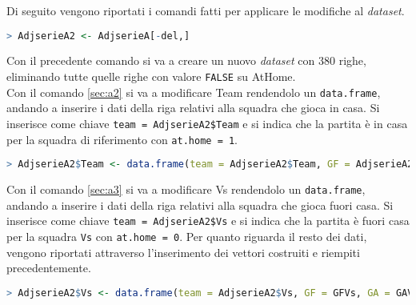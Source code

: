 Di seguito vengono riportati i comandi fatti per applicare le modifiche al \emph{dataset}.

\begin{lstlisting}[language=R]
	> AdjserieA2 <- AdjserieA[-del,]
\end{lstlisting}

Con il precedente comando si va a creare un nuovo \emph{dataset} con 380 righe, eliminando tutte quelle righe con valore \texttt{FALSE} su \textsf{AtHome}. \\
Con il comando \ref{sec:a2} si va a modificare \textsf{Team} rendendolo un \texttt{data.frame}, andando a inserire i dati della riga relativi alla squadra che gioca in casa. Si inserisce come chiave \texttt{team = AdjserieA2\$Team} e si indica che la partita è in casa per la squadra di riferimento con \texttt{at.home = 1}.\\

\begin{lstlisting}[language=R, caption={Codice per la creazione del data.frame Team}, label=sec:a2] 
	> AdjserieA2$Team <- data.frame(team = AdjserieA2$Team, GF = AdjserieA2$GF, GA = AdjserieA2$GA,  at.home = 1, Poss = AdjserieA2$Poss, Sh = AdjserieA2$Sh, SoT = AdjserieA2$SoT, G.Sh = AdjserieA2$G.Sh, PAtt = AdjserieA2$PAtt, PCmp. = AdjserieA2$PCmp., SPAtt = AdjserieA2$SPAtt, SPCmp. = AdjserieA2$SPCmp., MPAtt = AdjserieA2$MPAtt, MPCmp. = AdjserieA2$MPCmp., LPAtt = AdjserieA2$LPAtt, LPCmp. = AdjserieA2$LPCmp., ToDef3rd = AdjserieA2$ToDef3rd, ToAtt3rd = AdjserieA2$ToAtt3rd, ToAttPen = AdjserieA2$ToAttPen, TotDist = AdjserieA2$TotDist, Fls = AdjserieA2$Fls, Fld = AdjserieA2$Fld, Crs = AdjserieA2$Crs, Int = AdjserieA2$Int, TklWin = AdjserieA2$TklWin, Recov = AdjserieA2$Recov)
\end{lstlisting}
\bigskip

Con il comando \ref{sec:a3} si va a modificare \textsf{Vs} rendendolo un \texttt{data.frame}, andando a inserire i dati della riga relativi alla squadra che gioca fuori casa. Si inserisce come chiave \texttt{team = AdjserieA2\$Vs} e si indica che la partita è fuori casa per la squadra \texttt{Vs} con \texttt{at.home = 0}. Per quanto riguarda il resto dei dati, vengono riportati attraverso l'inserimento dei vettori costruiti e riempiti precedentemente.\\

\begin{lstlisting}[language=R, caption={Codice per la creazione del data.frame Vs}, captionpos=b, label=sec:a3]
	> AdjserieA2$Vs <- data.frame(team = AdjserieA2$Vs, GF = GFVs, GA = GAVs, at.home = 0, Poss = PossVs, Sh = ShVs, SoT = ShTVs, G.Sh = G.ShVs, PAtt = PAttVs, PCmp. = PCmp.Vs, SPAtt = SPAttVs, SPCmp. = SPCmp.Vs, MPAtt = MPAttVs, MPCmp. = MPCmp.Vs, LPAtt = LPAttVs, LPCmp. = LPCmp.Vs, ToDef3rd = ToDef3rdVs, ToAtt3rd = ToAtt3rdVs, ToAttPen = ToAttPenVs, TotDist = ToDistVs, Fls = FlsVs, Fld = FldVs, Crs = CrsVs, Int = IntVs, TklWin = TklWinVs, Recov = RecovVs)
\end{lstlisting}


